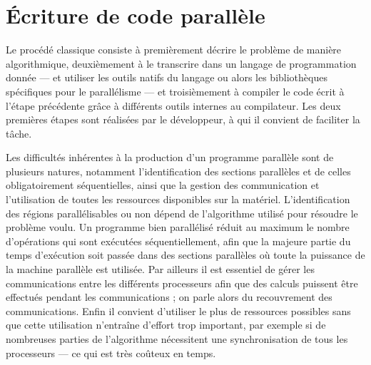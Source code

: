\section{\'Ecriture de code parallèle}


Le procédé classique consiste à premièrement décrire le problème de manière algorithmique, deuxièmement à le transcrire dans un langage de programmation donnée --- et utiliser les outils natifs du langage ou alors les bibliothèques spécifiques pour le parallélisme --- et troisièmement à compiler le code écrit à l'étape précédente grâce à différents outils internes au compilateur. Les deux premières étapes sont réalisées par le développeur, à qui il convient de faciliter la tâche. 

Les difficultés inhérentes à la production d'un programme parallèle sont de plusieurs natures, notamment l'identification des sections parallèles et de celles obligatoirement séquentielles, ainsi que la gestion des communication et l'utilisation de toutes les ressources disponibles sur la matériel. L'identification des régions parallélisables ou non dépend de l'algorithme utilisé pour résoudre le problème voulu. Un programme bien parallélisé réduit au maximum le nombre d'opérations qui sont exécutées séquentiellement, afin que la majeure partie du temps d'exécution soit passée dans des sections parallèles où toute la puissance de la machine parallèle est utilisée. Par ailleurs il est essentiel de gérer les communications entre les différents processeurs afin que des calculs puissent être effectués pendant les communications ; on parle alors du recouvrement des communications. Enfin il convient d'utiliser le plus de ressources possibles sans que cette utilisation n'entraîne d'effort trop important, par exemple si de nombreuses parties de l'algorithme nécessitent une synchronisation de tous les processeurs --- ce qui est très coûteux en temps.

